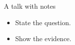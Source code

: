 \documentclass{beamer}
\begin{document}
\begin{frame}{A talk with notes}
\begin{itemize}\item State the question.\item Show the evidence.\end{itemize}
\end{frame}
\end{document}
